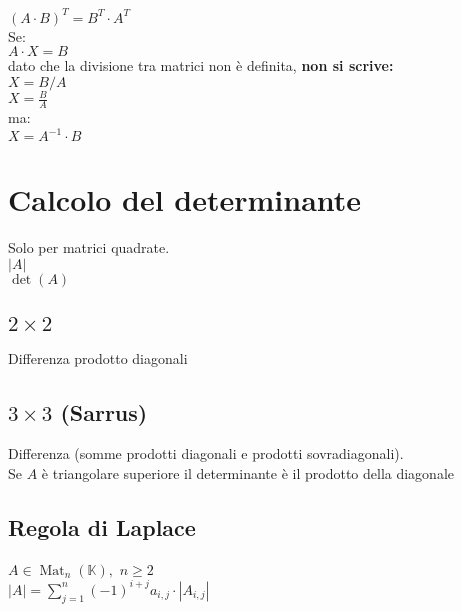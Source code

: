 \documentclass[a4paper, twoside, italian, 11pt]{book}
\newcommand{\detm}[1] {\left | #1 \right |}
\DeclareMathOperator{\Mat}{Mat}
\newcommand{\K}{\mathbb K}
\begin{document}
\noindent
$(A \cdot B)^T = B^T \cdot A^T$ \\

\noindent
Se: \\

$A \cdot X = B$ \\

\noindent
dato che la divisione tra matrici non è definita, \textbf{non si scrive:} \\

$X = B / A$ \\
\indent
$X = \frac{B}{A}$ \\

\noindent
ma: \\

$X = A^{-1} \cdot B$



\section{Calcolo del determinante}

Solo per matrici quadrate. \\

\noindent
$\detm A$ \\

\noindent
$\det(A)$



\subsection{$2 \times 2$}

Differenza prodotto diagonali


\subsection{$3 \times 3$ (Sarrus)}

Differenza (somme prodotti diagonali e prodotti sovradiagonali). \\

\noindent
Se $A$ è triangolare superiore il determinante è il prodotto della diagonale


\subsection{Regola di Laplace}

$A \in \Mat_n(\K),$ $n \geq 2$ \\

\noindent
$\detm A = \sum\limits_{j=1}^{n} (-1)^{i+j} a_{i,j} \cdot \detm{A_{i,j}} $ \\
\end{document}

